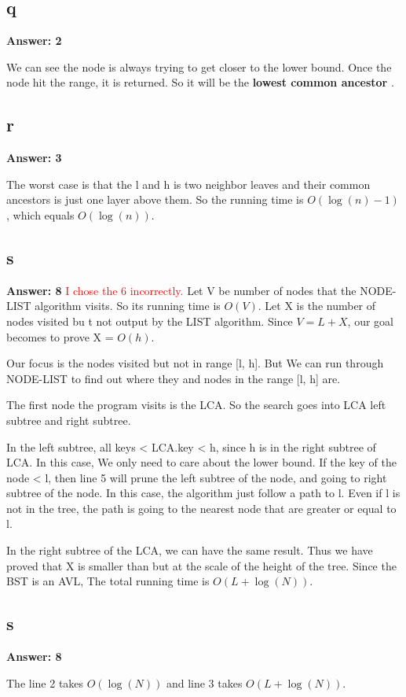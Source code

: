 \documentclass[12pt]{article}%
\newcommand{\runningTime}[1]{$O(#1)$}
\begin{document}
\subsection{q}
\textbf{Answer: 2} \par
We can see the node is always trying to get closer to the lower bound. Once the node hit the range, it is returned. So it will be the \textbf{lowest common ancestor} .

\subsection{r}
\textbf{Answer: 3} \par
The worst case is that the l and h is two neighbor leaves and their common ancestors is just one layer above them. So the running time is \runningTime{\log(n) -1}, which equals \runningTime{\log(n)}.

\subsection{s}
\textbf{Answer: 8} \textcolor{red}{I chose the 6 incorrectly.}
Let V be number of nodes that the NODE-LIST algorithm visits. So its running time is \runningTime{V}. Let X is the number of nodes visited bu t not output by the LIST algorithm. Since $V = L + X$,  our goal becomes to prove X = \runningTime{h}.

Our focus is the nodes visited but not in range [l, h]. But We can run through NODE-LIST to find out where they and nodes in the range [l, h] are. \par
The first node the program visits is the LCA. So the search goes into LCA left subtree and right subtree. \par
In the left subtree, all keys < LCA.key < h, since h is in the right subtree of LCA. In this case, We only need to care about the lower bound.
If the key of the node < l, then line 5 will prune the left subtree of the node, and going to right subtree of the node. In this case, the algorithm just follow a path to l. Even if l is not in the tree, the path is going to the nearest node that are greater or equal to l. \par
In the right subtree of the LCA, we can have the same result. Thus we have proved that X is smaller than but at the scale of  the height of the tree. Since the BST is an AVL, The total running time is \runningTime{L + \log(N)}.

\subsection{s}
\textbf{Answer: 8} \par
The line 2 takes \runningTime{\log(N)} and line 3 takes \runningTime{L + \log(N)}.
\end{document}
